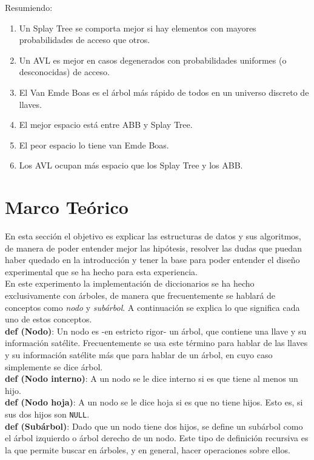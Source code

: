\documentclass[12pt,letterpaper]{report}
\begin{document}
Resumiendo:

\begin{enumerate}
\item Un Splay Tree se comporta mejor si hay elementos con mayores probabilidades de acceso que otros.
\item Un AVL es mejor en casos degenerados con probabilidades uniformes (o desconocidas) de acceso.
\item El Van Emde Boas es el árbol más rápido de todos en un universo discreto de llaves.
\item El mejor espacio está entre ABB y Splay Tree.
\item El peor espacio lo tiene van Emde Boas.
\item Los AVL ocupan más espacio que los Splay Tree y los ABB.
\end{enumerate}

\newpage
\section{Marco Teórico}
\label{sec:marco}

En esta sección el objetivo es explicar las estructuras de datos y sus algoritmos, de manera de poder entender mejor las hipótesis, resolver las dudas que puedan haber quedado en la introducción y tener la base para poder entender el diseño experimental que se ha hecho para esta experiencia.\\

En este experimento la implementación de diccionarios se ha hecho exclusivamente con árboles, de manera que frecuentemente se hablará de conceptos como \emph{nodo} y \emph{subárbol}. A continuación se explica lo que significa cada uno de estos conceptos.\\

\textbf{def (Nodo)}: Un nodo es -en estricto rigor- un árbol, que contiene una llave y su información satélite. Frecuentemente se usa este término para hablar de las llaves y su información satélite más que para hablar de un árbol, en cuyo caso simplemente se dice árbol.\\

\textbf{def (Nodo interno)}: A un nodo se le dice interno si es que tiene al menos un hijo.\\
\textbf{def (Nodo hoja)}: A un nodo se le dice hoja si es que no tiene hijos. Esto es, si sus dos hijos son \texttt{NULL}.\\

\textbf{def (Subárbol)}: Dado que un nodo tiene dos hijos, se define un subárbol como el árbol izquierdo o árbol derecho de un nodo. Este tipo de definición recursiva es la que permite buscar en árboles, y en general, hacer operaciones sobre ellos.\\
\end{document}
